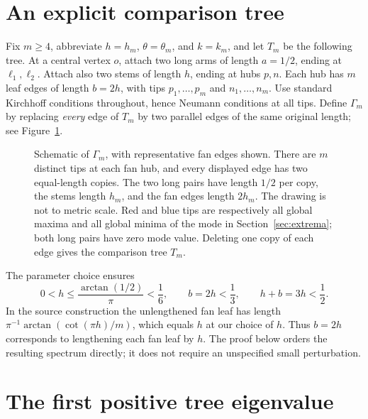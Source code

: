 \documentclass[11pt]{article}
\numberwithin{equation}{section}
\theoremstyle{remark}
\newcommand{\T}{T_m}
\newcommand{\G}{\Gamma_m}
\begin{document}
\section{An explicit comparison tree}

Fix \(m\geq4\), abbreviate \(h=h_m\), \(\theta=\theta_m\), and \(k=k_m\),
and let \(\T\) be the following tree. At a central vertex \(o\), attach
two long arms of length \(a=1/2\), ending at \(\ell_1,\ell_2\).
Attach also two stems of length \(h\), ending at hubs \(p,n\).
Each hub has \(m\) leaf edges of length \(b=2h\), with tips
\(p_1,\ldots,p_m\) and \(n_1,\ldots,n_m\).
Use standard Kirchhoff conditions throughout, hence Neumann conditions
at all tips. Define \(\G\) by replacing \emph{every} edge of \(\T\) by two
parallel edges of the same original length; see Figure~\ref{fig:graph}.

\begin{figure}[htbp]
  \centering
  
  \caption{Schematic of \(\Gamma_m\), with representative fan edges shown.
  There are \(m\) distinct tips at each fan hub, and every displayed edge
  has two equal-length copies. The two long pairs have length \(1/2\)
  per copy, the stems length \(h_m\), and the fan edges length \(2h_m\).
  The drawing is not to metric scale. Red and blue tips are respectively
  all global maxima and all global minima of the mode in
  Section~\ref{sec:extrema}; both long pairs have zero mode value.
  Deleting one copy of each edge gives the comparison tree \(T_m\).}
  \label{fig:graph}
\end{figure}

The parameter choice ensures
\begin{equation}\label{eq:length-bounds}
  0<h\leq\frac{\arctan(1/2)}{\pi}<\frac16,\qquad
  b=2h<\frac13,\qquad h+b=3h<\frac12.
\end{equation}
In the source construction the unlengthened fan leaf has length
\(\pi^{-1}\arctan(\cot(\pi h)/m)\), which equals \(h\) at our choice
of \(h\). Thus \(b=2h\) corresponds to lengthening each fan leaf by
\(h\). The proof below orders the resulting spectrum directly;
it does not require an unspecified small perturbation.

\section{The first positive tree eigenvalue}\label{sec:tree-spectrum}
\end{document}
